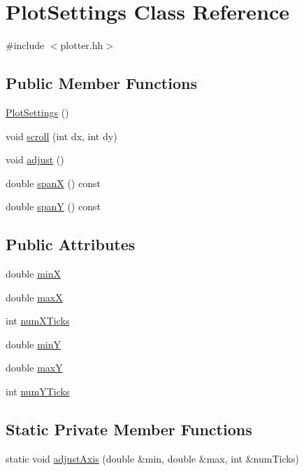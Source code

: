 \hypertarget{class_plot_settings}{\section{\-Plot\-Settings \-Class \-Reference}
\label{class_plot_settings}
}


{\ttfamily \#include $<$plotter.\-hh$>$}

\subsection*{\-Public \-Member \-Functions}
\begin{DoxyCompactItemize}
\item 
\hyperlink{class_plot_settings_acf6e5ffc85b66759c8711fd07e146332}{\-Plot\-Settings} ()
\item 
void \hyperlink{class_plot_settings_a75adc325387104c532df9004c10c62f6}{scroll} (int dx, int dy)
\item 
void \hyperlink{class_plot_settings_abfc8b0fcc9311636022156df6a7e446a}{adjust} ()
\item 
double \hyperlink{class_plot_settings_ad2d73a5c02b00c4676cfd4b79f3477a5}{span\-X} () const 
\item 
double \hyperlink{class_plot_settings_a346be9b63b807112c7b7247d717fec32}{span\-Y} () const 
\end{DoxyCompactItemize}
\subsection*{\-Public \-Attributes}
\begin{DoxyCompactItemize}
\item 
double \hyperlink{class_plot_settings_a0f3c3bfbc9387ca63259b8316488530e}{min\-X}
\item 
double \hyperlink{class_plot_settings_a14fb707bc407b135c8733bf26a78fe98}{max\-X}
\item 
int \hyperlink{class_plot_settings_a6cb8aae67d8e1fc60ccb61f50b37bf0c}{num\-X\-Ticks}
\item 
double \hyperlink{class_plot_settings_ad3cc5104ce9c973747a166f940f73962}{min\-Y}
\item 
double \hyperlink{class_plot_settings_a79c0bea58aa61bffe86d2b282d1ce7dd}{max\-Y}
\item 
int \hyperlink{class_plot_settings_a8951d83f460971da1fa7d582a510e19c}{num\-Y\-Ticks}
\end{DoxyCompactItemize}
\subsection*{\-Static \-Private \-Member \-Functions}
\begin{DoxyCompactItemize}
\item 
static void \hyperlink{class_plot_settings_af94ab8a7b08e30f11f584283fc27ec55}{adjust\-Axis} (double \&min, double \&max, int \&num\-Ticks)
\end{DoxyCompactItemize}



